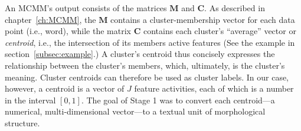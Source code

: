 {%


An MCMM's output consists of 
the matrices $\mathbf{M}$ and $\mathbf{C}$. As described in 
chapter~\ref{ch:MCMM}, the $\mathbf{M}$ contains a cluster-membership 
vector for each data point (i.e., word), while the matrix $\mathbf{C}$ contains 
each cluster's ``average'' vector or \emph{centroid}, i.e., the intersection 
of its members active features (See the example in section~\ref{subsec:example}.)
A cluster's centroid thus concisely expresses the relationship between the cluster's members, which, ultimately, is the cluster's meaning. 
Cluster centroids can therefore be used as cluster labels. In our case, however, a centroid is a vector of $J$ feature activities, each of which is a number in the interval $[0,1]$. 
The goal of Stage 1 was to convert each centroid---a numerical, 
multi-dimensional vector---to a textual unit of morphological structure.

}
